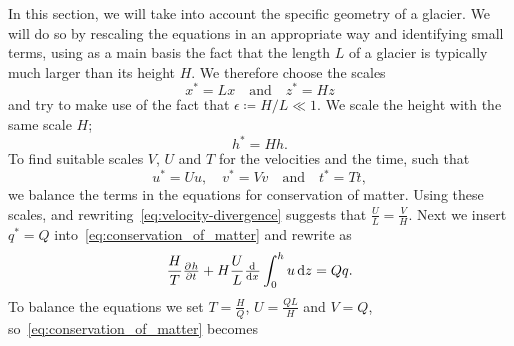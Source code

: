 \begin{comment}
In this section, we will take into account the specific geometry of a glacier.  We will do so by rescaling the equations in an appropriate way and identifying (and later ignoring) small terms, using as a main basis the fact that the length $L$ of a glacier is typically much larger than its height $H$. We therefore choose the scales
%
\begin{equation*}
    x^* = Lx \quad \text{and} \quad z^*=Hz
\end{equation*}
%
and try to make use of the fact that
%
\begin{equation*}
    \epsilon \coloneqq \frac{H}{L} \ll 1.
\end{equation*}
%
We scale the height with the same scale $H$;
%
\begin{equation*}
    h^* = Hh.
\end{equation*}
\end{comment}
In this section, we will take into account the specific geometry of a glacier.  We will do so by rescaling the equations in an appropriate way and identifying small terms, using as a main basis the fact that the length $L$ of a glacier is typically much larger than its height $H$. We therefore choose the scales
%
\begin{equation*}
    x^* = Lx \quad \text{and} \quad z^*=Hz
\end{equation*}
%
and try to make use of the fact that $\epsilon \coloneqq H/L \ll 1$.
%
We scale the height with the same scale $H$;
%
\begin{equation*}
    h^* = Hh.
\end{equation*}
To find suitable scales $V$, $U$ and $T$ for the velocities and the time, such that
%
\begin{equation*}
    u^* = Uu, \quad v^* = Vv \quad \text{and} \quad t^* = Tt,
\end{equation*}
%
we balance the terms in the equations for conservation of matter. Using these scales, and rewriting~\eqref{eq:velocity-divergence} suggests that $\frac{U}{L} = \frac{V}{H}$. Next we insert $q^* = Q$ into~\eqref{eq:conservation_of_matter} and rewrite as
\begin{equation*}
    \frac{H}{T} \pd{h}{t} + H \frac{U}{L} \od{}{x} \int_0^h u \dif{z} = Qq.
\end{equation*}
%
To balance the equations we set $T = \frac{H}{Q}$, $U = \frac{QL}{H}$ and $V = Q$, so~\eqref{eq:conservation_of_matter} becomes
